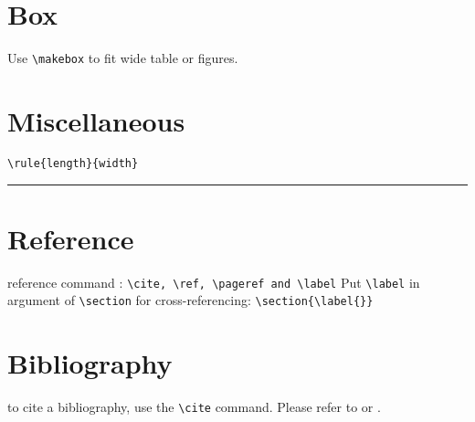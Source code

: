 \section{Box}
Use \verb|\makebox| to fit wide table or figures.

\section{Miscellaneous}
\verb|\rule{length}{width}|

{\color{red}	\rule{\linewidth}{0.5mm} }
\section{Reference}
reference command :
\verb|\cite, \ref, \pageref and \label|
Put \verb|\label| in argument of \verb|\section| for cross-referencing:
\verb|\section{\label{}}|

\section{Bibliography}
to cite a bibliography, use the \verb|\cite| command. 
Please refer to \cite{wiki} or \cite[option]{wiki}.

